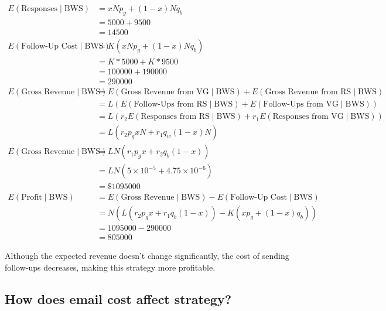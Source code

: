 \documentclass{article}
\begin{document}
\begin{align}
E\left( \text{Responses} \mid \text{BWS} \right)
	& = x N p_g + (1 - x) N q_b \nonumber \\
	& = 5000 + 9500 \nonumber \\
	& = 14500 \nonumber \\
E\left( \text{Follow-Up Cost} \mid \text{BWS} \right) 
	& = K \left(x N p_g + (1 - x) N q_b \right) \nonumber \\
	& = K * 5000 + K * 9500 \nonumber \\
	& = 100000 + 190000 \nonumber\\
	& = 290000 \nonumber\\ 
E\left( \text{Gross Revenue} \mid \text{BWS} \right)
	& = E\left( \text{Gross Revenue from VG} \mid \text{BWS} \right)
	+ E\left( \text{Gross Revenue from RS} \mid \text{BWS} \right) \nonumber \\
	& = L \left( 
		E\left( \text{Follow-Ups from RS} \mid \text{BWS} \right)
		+ E\left( \text{Follow-Ups from VG} \mid \text{BWS} \right) \right) \nonumber \\
	& = L \left( 
		r_2 E\left( \text{Responses from RS} \mid \text{BWS} \right)
		+ r_1 E\left( \text{Responses from VG} \mid \text{BWS} \right) \right) \nonumber \\
	& = L \left( 
		r_2 p_g x N
		+ r_1 q_w (1-x) N  \right) \nonumber \\
E\left( \text{Gross Revenue} \mid \text{BWS} \right)
	& = L N \left( r_1 p_g x + r_2 q_b (1-x) \right) \nonumber \\
	& = L N \left( 5 \times 10^{-5} + 4.75 \times 10^{-6} \right) \nonumber \\
	& = \$ 1095000 \nonumber \\
E\left( \text{Profit} \mid \text{BWS} \right)
	& = E\left( \text{Gross Revenue} \mid \text{BWS} \right)
	- E\left( \text{Follow-Up Cost} \mid \text{BWS} \right) \nonumber \\
	& = N \left( L \left( 
		r_2 p_g x
		+ r_1 q_b (1-x)  \right) 
	- K \left(x p_g + (1 - x) q_b \right) \right) \nonumber\\
	& = 1095000 - 290000 \nonumber \\
	& = 805000 \nonumber
\end{align}

Although the expected revenue doesn't change significantly,
	the cost of sending follow-ups decreases, making this strategy
	more profitable.

\subsection{How does email cost affect strategy?}
\end{document}
